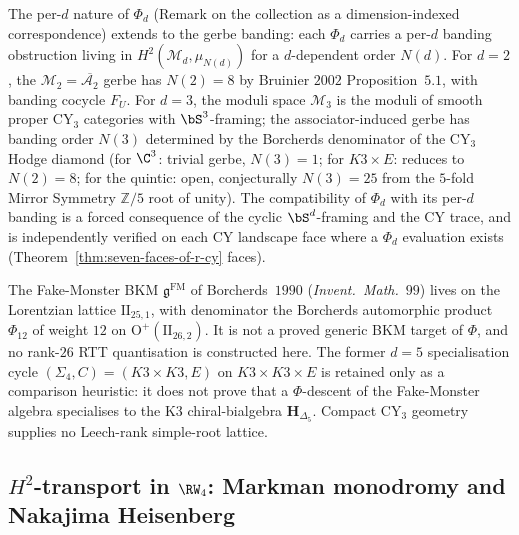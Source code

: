 \begin{remark}
\label{rem:cy2ch-phi-d-gerbe-banding}
The per-$d$ nature of $\Phi_d$ (Remark on the collection as a
dimension-indexed correspondence) extends to the gerbe banding: each $\Phi_d$
carries a per-$d$ banding obstruction living in $H^2(\mathcal{M}_d,
\mu_{N(d)})$ for a $d$-dependent order $N(d)$. For $d = 2$, the
$\mathcal{M}_2 = \overline{\mathcal{A}_2}$ gerbe has
$N(2) = 8$ by Bruinier $2002$ Proposition~$5.1$, with banding cocycle
$F_U$. For $d = 3$, the moduli space $\mathcal{M}_3$
is the moduli of smooth proper CY$_3$ categories with $\bS^3$-framing;
the associator-induced gerbe has banding order $N(3)$ determined by
the Borcherds denominator of the CY$_3$ Hodge diamond (for
$\C^3$: trivial gerbe, $N(3) = 1$; for $K3 \times E$: reduces to
$N(2) = 8$; for the quintic: open, conjecturally $N(3) = 25$ from
the $5$-fold Mirror Symmetry $\mathbb Z/5$ root of unity). The
compatibility of $\Phi_d$ with its per-$d$ banding is a forced
consequence of the cyclic $\bS^d$-framing and the CY trace, and is
independently verified on each CY landscape face where a $\Phi_d$
evaluation exists (Theorem~\ref{thm:seven-faces-of-r-cy} faces).
\end{remark}

\begin{remark}
\label{rem:cy2ch-fake-monster-generic}
The Fake-Monster BKM $\mathfrak{g}^{\mathrm{FM}}$ of Borcherds~$1990$
(\emph{Invent.~Math.}~$99$) lives on the Lorentzian lattice
$\mathrm{II}_{25,1}$, with denominator the Borcherds automorphic
product $\Phi_{12}$ of weight $12$ on
$\mathrm{O}^{+}(\mathrm{II}_{26,2})$. It is not a proved generic BKM
target of $\Phi$, and no rank-$26$ RTT quantisation is constructed here.
The former $d=5$ specialisation cycle
$(\Sigma_4,C)=(K3\times K3,E)$ on $K3\times K3\times E$ is retained only
as a comparison heuristic: it does not prove that a $\Phi$-descent of the
Fake-Monster algebra specialises to the K3 chiral-bialgebra
$\mathbf H_{\Delta_5}$. Compact CY$_3$ geometry supplies no
Leech-rank simple-root lattice.
\end{remark}

\subsection{\texorpdfstring{$H^2$}{H2}-transport in
\texorpdfstring{$\RW_4$}{RW-4}: Markman monodromy and Nakajima Heisenberg}
\label{subsec:rw4-markman-monodromy-morphism}

